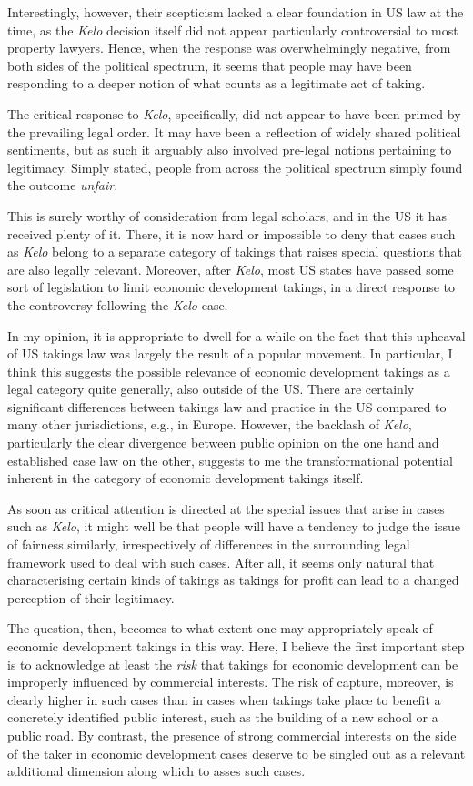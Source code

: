 \documentclass{book} %
\begin{document}
Interestingly, however, their scepticism lacked a clear foundation in US law at the time, as the {\it Kelo} decision itself did not appear particularly controversial to most property lawyers. Hence, when the response was overwhelmingly negative, from both sides of the political spectrum, it seems that people may have been responding to a deeper notion of what counts as a legitimate act of taking.

The critical response to {\it Kelo}, specifically, did not appear to have been primed by the prevailing legal order. It may have been a reflection of widely shared political sentiments, but as such it arguably also involved pre-legal notions pertaining to legitimacy. Simply stated, people from across the political spectrum simply found the outcome {\it unfair}.

This is surely worthy of consideration from legal scholars, and in the US it has received plenty of it. There, it is now hard or impossible to deny that cases such as {\it Kelo} belong to a separate category of takings that raises special questions that are also legally relevant. Moreover, after {\it Kelo}, most US states have passed some sort of legislation to limit economic development takings, in a direct response to the controversy following the {\it Kelo} case. 

In my opinion, it is appropriate to dwell for a while on the fact that this upheaval of US takings law was largely the result of a popular movement. In particular, I think this suggests the possible relevance of economic development takings as a legal category quite generally, also outside of the US. There are certainly significant differences between takings law and practice in the US compared to many other jurisdictions, e.g., in Europe. However, the backlash of {\it Kelo}, particularly the clear divergence between public opinion on the one hand and established case law on the other, suggests to me the transformational potential inherent in the category of economic development takings itself.

As soon as critical attention is directed at the special issues that arise in cases such as {\it Kelo}, it might well be that people will have a tendency to judge the issue of fairness similarly, irrespectively of differences in the surrounding legal framework used to deal with such cases. After all, it seems only natural that characterising certain kinds of takings as takings for profit can lead to a changed perception of their legitimacy.

The question, then, becomes to what extent one may appropriately speak of economic development takings in this way. Here, I believe the first important step is to acknowledge at least the {\it risk} that takings for economic development can be improperly influenced by commercial interests. The risk of capture, moreover, is clearly higher in such cases than in cases when takings take place to benefit a concretely identified public interest, such as the building of a new school or a public road. By contrast, the presence of strong commercial interests on the side of the taker in economic development cases deserve to be singled out as a relevant additional dimension along which to asses such cases.
\end{document}
